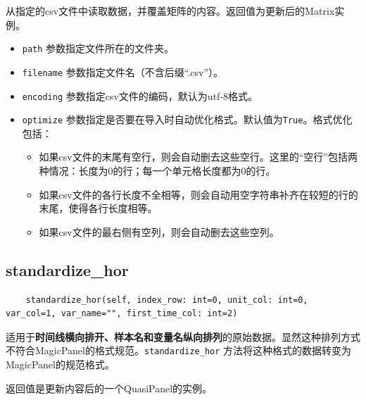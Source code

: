 \documentclass[a4paper, UTF8, fontset=none]{ctexart}
\begin{document}
    从指定的csv文件中读取数据，并覆盖矩阵的内容。返回值为更新后的Matrix实例。

    \begin{itemize}
        \item \verb|path| 参数指定文件所在的文件夹。
        \item \verb|filename| 参数指定文件名（不含后缀“.csv”）。
        \item \verb|encoding| 参数指定csv文件的编码，默认为utf-8格式。
        \item \verb|optimize| 参数指定是否要在导入时自动优化格式。默认值为\verb|True|。格式优化包括：
        \begin{itemize}
            \item 如果csv文件的末尾有空行，则会自动删去这些空行。这里的“空行”包括两种情况：长度为0的行；每一个单元格长度都为0的行。
            \item 如果csv文件的各行长度不全相等，则会自动用空字符串补齐在较短的行的末尾，使得各行长度相等。
            \item 如果csv文件的最右侧有空列，则会自动删去这些空列。
        \end{itemize}
    \end{itemize}

\subsection{standardize\_hor}

    \begin{lstlisting}
    standardize_hor(self, index_row: int=0, unit_col: int=0, var_col=1, var_name="", first_time_col: int=2)
    \end{lstlisting}    

    适用于\textbf{时间线横向排开、样本名和变量名纵向排列}的原始数据。显然这种排列方式不符合MagicPanel的格式规范。\verb|standardize_hor| 方法将这种格式的数据转变为MagicPanel的规范格式。

    返回值是更新内容后的一个QuasiPanel的实例。
\end{document}

